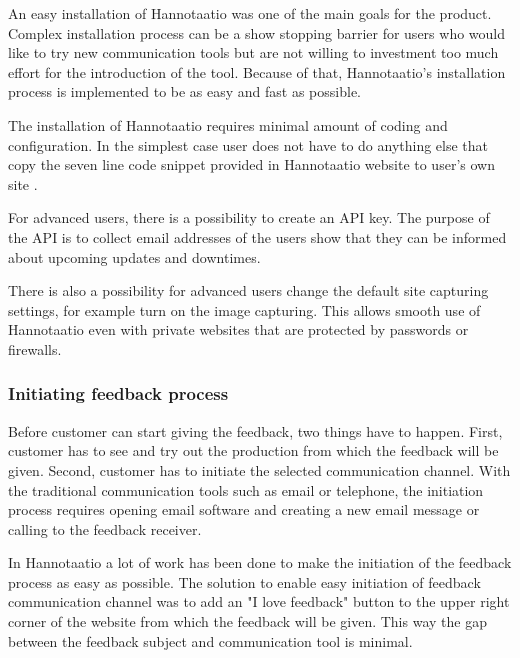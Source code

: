 \documentclass[english,12pt,a4paper,pdftex]{article}
\begin{document}
An easy installation of Hannotaatio was one of the main goals for the product. Complex installation process can be a show stopping barrier for users who would like to try new communication tools but are not willing to investment too much effort for the introduction of the tool. Because of that, Hannotaatio's installation process is implemented to be as easy and fast as possible.

The installation of Hannotaatio requires minimal amount of coding and configuration. In the simplest case user does not have to do anything else that copy the seven line code snippet provided in Hannotaatio website to user's own site \citep{hannotaatio}.

For advanced users, there is a possibility to create an \ac{API} key. The purpose of the \ac{API} is to collect email addresses of the users show that they can be informed about upcoming updates and downtimes.

There is also a possibility for advanced users change the default site capturing settings, for example turn on the image capturing. This allows smooth use of Hannotaatio even with private websites that are protected by passwords or firewalls.

\subsubsection{Initiating feedback process}

Before customer can start giving the feedback, two things have to happen. First, customer has to see and try out the production from which the feedback will be given. Second, customer has to initiate the selected communication channel. With the traditional communication tools such as email or telephone, the initiation process requires opening email software and creating a new email message or calling to the feedback receiver.

In Hannotaatio a lot of work has been done to make the initiation of the feedback process as easy as possible. The solution to enable easy initiation of feedback communication channel was to add an "I love feedback" button to the upper right corner of the website from which the feedback will be given. This way the gap between the feedback subject and communication tool is minimal.
\end{document}
